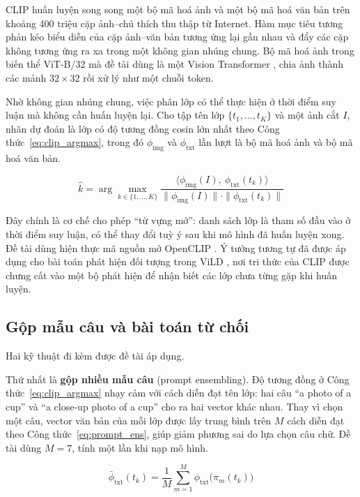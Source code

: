 CLIP \cite{radford2021clip} huấn luyện song song một bộ mã hoá ảnh và một bộ mã hoá văn bản trên
khoảng 400 triệu cặp ảnh--chú thích thu thập từ Internet. Hàm mục tiêu tương phản kéo biểu diễn
của cặp ảnh--văn bản tương ứng lại gần nhau và đẩy các cặp không tương ứng ra xa trong một không
gian nhúng chung. Bộ mã hoá ảnh trong biến thể ViT-B/32 mà đề tài dùng là một Vision Transformer
\cite{dosovitskiy2021vit}, chia ảnh thành các mảnh $32 \times 32$ rồi xử lý như một chuỗi token.

Nhờ không gian nhúng chung, việc phân lớp có thể thực hiện ở thời điểm suy luận mà không cần
huấn luyện lại. Cho tập tên lớp $\{t_1, \dots, t_K\}$ và một ảnh cắt $I$, nhãn dự đoán là lớp có
độ tương đồng cosin lớn nhất theo Công thức~\eqref{eq:clip_argmax}, trong đó $\phi_{\text{img}}$
và $\phi_{\text{txt}}$ lần lượt là bộ mã hoá ảnh và bộ mã hoá văn bản.

\begin{equation}
\label{eq:clip_argmax}
\hat{k} = \arg\max_{k \in \{1,\dots,K\}}
\frac{\langle \phi_{\text{img}}(I),\ \phi_{\text{txt}}(t_k) \rangle}
     {\|\phi_{\text{img}}(I)\| \cdot \|\phi_{\text{txt}}(t_k)\|}
\end{equation}

Đây chính là cơ chế cho phép ``từ vựng mở'': danh sách lớp là tham số đầu vào ở thời điểm suy
luận, có thể thay đổi tuỳ ý sau khi mô hình đã huấn luyện xong. Đề tài dùng hiện thực mã nguồn
mở OpenCLIP \cite{ilharco2021openclip}. Ý tưởng tương tự đã được áp dụng cho bài toán phát hiện
đối tượng trong ViLD \cite{gu2022vild}, nơi tri thức của CLIP được chưng cất vào một bộ phát
hiện để nhận biết các lớp chưa từng gặp khi huấn luyện.

\subsection{Gộp mẫu câu và bài toán từ chối}

Hai kỹ thuật đi kèm được đề tài áp dụng.

Thứ nhất là \textbf{gộp nhiều mẫu câu} (prompt ensembling). Độ tương đồng ở
Công thức~\eqref{eq:clip_argmax} nhạy cảm với cách diễn đạt tên lớp: hai câu ``a photo of a
cup'' và ``a close-up photo of a cup'' cho ra hai vector khác nhau. Thay vì chọn một câu, vector văn bản của
mỗi lớp được lấy trung bình trên $M$ cách diễn đạt theo Công thức~\eqref{eq:prompt_ens}, giúp
giảm phương sai do lựa chọn câu chữ. Đề tài dùng $M = 7$, tính một lần khi nạp mô hình.

\begin{equation}
\label{eq:prompt_ens}
\bar{\phi}_{\text{txt}}(t_k) = \frac{1}{M} \sum_{m=1}^{M} \phi_{\text{txt}}\big( \pi_m(t_k) \big)
\end{equation}

